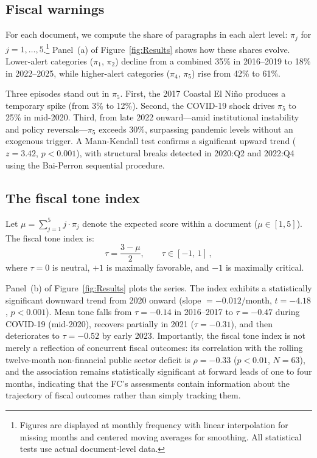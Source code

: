 \documentclass[a4paper, fleqn, 12pt]{article}
\begin{document}
\subsection{Fiscal warnings}

For each document, we compute the share of paragraphs in each alert level: $\pi_j$ for $j = 1, \ldots, 5$.\footnote{Figures are displayed at monthly frequency with linear interpolation for missing months and centered moving averages for smoothing. All statistical tests use actual document-level data.} Panel~(a) of Figure~\ref{fig:Results} shows how these shares evolve. Lower-alert categories ($\pi_1$, $\pi_2$) decline from a combined 35\% in 2016--2019 to 18\% in 2022--2025, while higher-alert categories ($\pi_4$, $\pi_5$) rise from 42\% to 61\%.

Three episodes stand out in $\pi_5$. First, the 2017 Coastal El Ni\~{n}o produces a temporary spike (from 3\% to 12\%). Second, the COVID-19 shock drives $\pi_5$ to 25\% in mid-2020. Third, from late 2022 onward---amid institutional instability and policy reversals---$\pi_5$ exceeds 30\%, surpassing pandemic levels without an exogenous trigger. A Mann-Kendall test confirms a significant upward trend ($z = 3.42$, $p < 0.001$), with structural breaks detected in 2020:Q2 and 2022:Q4 using the Bai-Perron sequential procedure.


\subsection{The fiscal tone index}

Let $\mu = \sum_{j=1}^{5} j \cdot \pi_j$ denote the expected score within a document ($\mu \in [1,5]$). The fiscal tone index is:
\[
\tau = \frac{3 - \mu}{2}, \qquad \tau \in [-1,\,1]\,,
\]
where $\tau = 0$ is neutral, $+1$ is maximally favorable, and $-1$ is maximally critical.

Panel~(b) of Figure~\ref{fig:Results} plots the series. The index exhibits a statistically significant downward trend from 2020 onward (slope $= -0.012$/month, $t = -4.18$, $p < 0.001$). Mean tone falls from $\tau = -0.14$ in 2016--2017 to $\tau = -0.47$ during COVID-19 (mid-2020), recovers partially in 2021 ($\tau = -0.31$), and then deteriorates to $\tau = -0.52$ by early 2023. Importantly, the fiscal tone index is not merely a reflection of concurrent fiscal outcomes: its correlation with the rolling twelve-month non-financial public sector deficit is $\rho = -0.33$ ($p < 0.01$, $N = 63$), and the association remains statistically significant at forward leads of one to four months, indicating that the FC's assessments contain information about the trajectory of fiscal outcomes rather than simply tracking them.
\end{document}

